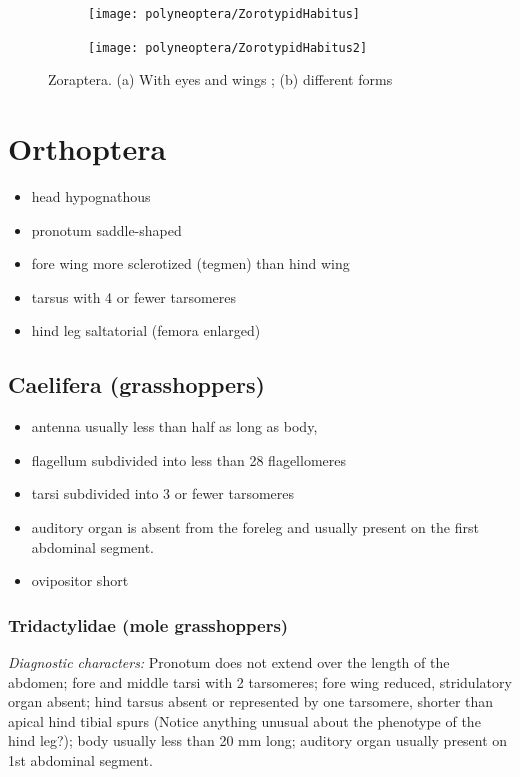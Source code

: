 \begin{figure}[ht!]
    \centering
    \begin{subfigure}[ht!]{0.44\textwidth}
        \texttt{[image: polyneoptera/ZorotypidHabitus]}
        \caption{}
        \label{fig:zorotypid1}
    \end{subfigure}
    \qquad
    \begin{subfigure}[ht!]{0.44\textwidth}
        \texttt{[image: polyneoptera/ZorotypidHabitus2]}
        \caption{}
        \label{fig:zorotypid2}
    \end{subfigure}
    \caption{Zoraptera. (a) With eyes and wings \citep[][Figs. 1,5]{bhlpart32187}; (b) different forms \citep[][Figs. 2--4]{bhlpart32187}}\label{fig:zorotypids}
\end{figure}

\section{Orthoptera}
\begin{itemize}
\item head hypognathous
\item pronotum saddle-shaped
\item fore wing more sclerotized (tegmen) than hind wing
\item tarsus with 4 or fewer tarsomeres
\item hind leg saltatorial (femora enlarged)
\end{itemize}

\subsection{Caelifera (grasshoppers)}
\begin{itemize}
\item antenna usually less than half as long as body, 
\item flagellum subdivided into less than 28 flagellomeres 
\item tarsi subdivided into 3 or fewer tarsomeres
\item auditory organ is absent from the foreleg and usually present on the first abdominal segment.
\item ovipositor short
\end{itemize}

\subsubsection{Tridactylidae (mole grasshoppers)}%
\noindent{}\textit{Diagnostic characters:} Pronotum does not extend over the length of the abdomen; fore and middle tarsi with 2 tarsomeres; fore wing reduced, stridulatory organ absent; hind tarsus absent or represented by one tarsomere, shorter than apical hind tibial spurs (Notice anything unusual about the phenotype of the hind leg?); body usually less than 20 mm long; auditory organ usually present on 1st abdominal segment.\vspace{3mm}

